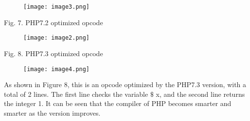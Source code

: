 \documentclass[12pt]{report}
\renewcommand{\_}{\kern-1.5pt\textunderscore\kern-1.5pt}
\begin{document}
\begin{multicols}{2}
\begin{figure}[H]
	\begin{Center}
		\texttt{[image: image3.png]}
	\end{Center}
\end{figure}

\begin{Center}
{\fontsize{8pt}{9.6pt}\selectfont Fig. 7. PHP7.2 optimized opcode}
\end{Center}

\begin{figure}[H]
	\begin{Center}
		\texttt{[image: image2.png]}
	\end{Center}
\end{figure}

\begin{Center}
{\fontsize{8pt}{9.6pt}\selectfont Fig. 8. PHP7.3 optimized opcode}
\end{Center}

\begin{figure}[H]
	\begin{Center}
		\texttt{[image: image4.png]}
	\end{Center}
\end{figure}

\vspace{\baselineskip}\begin{FlushLeft}
{\fontsize{10pt}{12.0pt}\selectfont As shown in Figure 8, this is an opcode optimized by the PHP7.3 version, with a total of 2 lines. The first line checks the variable $\$$ x, and the second line returns the integer 1. It can be seen that the compiler of PHP becomes smarter and smarter as the version improves.\par}
\end{FlushLeft}
\setlength{\parskip}{3.96pt}

\end{multicols}
\end{document}
